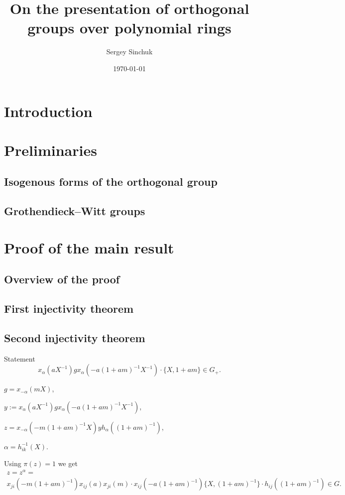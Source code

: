 \documentclass[oneside, 10pt]{amsart}
\title{On the presentation of orthogonal groups over polynomial rings}
\author {Sergey Sinchuk}
\date {\today}
\theoremstyle{remark} %
\theoremstyle{definition}
\begin{document}
\maketitle
\section{Introduction}
\section{Preliminaries}
\subsection{Isogenous forms of the orthogonal group}
\subsection{Grothendieck--Witt groups}
\section{Proof of the main result}
\subsection{Overview of the proof}
\subsection{First injectivity theorem}
\subsection{Second injectivity theorem}

Statement \[x_{\alpha}(aX^{-1}) g x_{\alpha}(-a(1+am)^{-1}X^{-1}) \cdot \{X, 1+am\} \in G_+.\]

$g = x_{-\alpha}(mX)$, 

$y := x_{\alpha}(aX^{-1}) g x_{\alpha}(-a(1+am)^{-1}X^{-1})$, 

$z = x_{-\alpha}(-m(1+am)^{-1}X) y h_{\alpha}((1+am)^{-1})$,

$\alpha = h_{ik}^{-1}(X)$.

Using $\pi(z) = 1$ we get 
\begin{multline}z = z^\alpha = \\ x_{ji}(-m(1+am)^{-1}) x_{ij}(a) x_{ji}(m) \cdot x_{ij}(-a(1+am)^{-1})\{X, (1+am)^{-1}\} \cdot h_{ij}((1+am)^{-1}) \in G. \end{multline}
\end{document}
